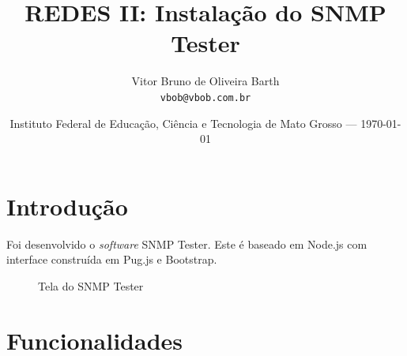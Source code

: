 \documentclass{article}
\title{REDES II: Instalação do SNMP Tester} %
\author{Vitor Bruno de Oliveira Barth\\ \texttt{vbob@vbob.com.br}} %
\date{Instituto Federal de Educação, Ciência e Tecnologia de Mato Grosso --- \today} %
\begin{document}
\maketitle %


\section{Introdução} %

Foi desenvolvido o \textit{software} SNMP Tester. Este é baseado em Node.js com interface construída em Pug.js e Bootstrap.

\bigskip
\bigskip
\bigskip

\begin{figure}[!htb]
    \caption{\label{fig:my-label} Tela do SNMP Tester}
\end{figure}


\pagebreak


\section{Funcionalidades} %
\end{document}
